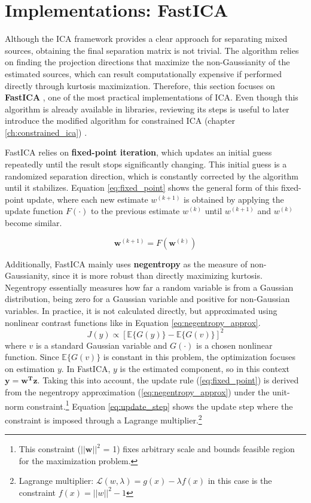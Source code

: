 \section{Implementations: FastICA}
\label{sec:ica_implementation}


Although the ICA framework provides a clear approach for separating mixed sources, obtaining the final separation matrix is not trivial. The algorithm relies on finding the projection directions that maximize the non-Gaussianity of the estimated sources, which can result computationally expensive if performed directly through kurtosis maximization. Therefore, this section focuses on \textbf{FastICA} \cite{scikit-learn_scikit-learnsklearndecomposition_fasticapy_nodate}, one of the most practical implementations of ICA. Even though this algorithm is already available in libraries, reviewing its steps is useful to later introduce the modified algorithm for constrained ICA (chapter \ref{ch:constrained_ica})
. 

FastICA relies on \textbf{fixed-point iteration}, which updates an initial guess repeatedly until the result stops significantly changing. This initial guess is a randomized separation direction, which is constantly corrected by the algorithm until it stabilizes. Equation \ref{eq:fixed_point} shows the general form of this fixed-point update, where each new estimate $w^{(k+1)}$ is obtained by applying the update function $F(\cdot)$ to the previous estimate $w^{(k)}$ until $w^{(k+1)}$ and $w^{(k)}$ become similar.

\begin{equation}
    \mathbf{w}^{(k+1)} = F(\mathbf{w}^{(k)})
    \label{eq:fixed_point}
\end{equation}


Additionally, FastICA mainly uses \textbf{negentropy} as the measure of non-Gaussianity, since it is more robust than directly maximizing kurtosis. Negentropy essentially measures how far a random variable is from a Gaussian distribution, being zero for a Gaussian variable and positive for non-Gaussian variables. In practice, it is not calculated directly, but approximated using nonlinear contrast functions like in Equation \ref{eq:negentropy_approx}.
\begin{equation}
    J(y) \propto
\left[
\mathbb{E}\{G(y)\}
-
\mathbb{E}\{G(v)\}
\right]^2
\label{eq:negentropy_approx}
\end{equation}
where \(v\) is a standard Gaussian variable and \(G(\cdot)\) is a chosen nonlinear function. Since $\mathbb{E}\{G(v)\}$ is constant in this problem, the optimization focuses on estimation $y$. In FastICA, $y$ is the estimated component, so in this context $\mathbf{y=w^T z}$. Taking this into account, the update rule (\ref{eq:fixed_point}) is derived from the negentropy approximation (\ref{eq:negentropy_approx}) under the unit-norm constraint.\footnote{This constraint ($|| \mathbf{w}||^2$ = 1) fixes arbitrary scale and bounds feasible region for the maximization problem.} Equation \ref{eq:update_step} shows the update step where the constraint is imposed through a Lagrange multiplier.\footnote{Lagrange multiplier: $\mathcal{L}(w,\lambda)=g(x)-\lambda f(x)$ in this case is the constraint $f(x)=||w||^2-1$}

